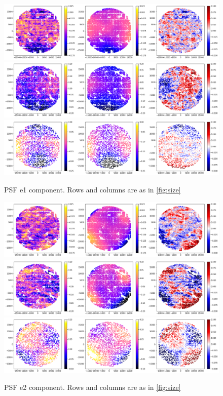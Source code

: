 \documentclass{article}
\begin{document}
\begin{figure}
    \includegraphics[width=\textwidth]{e1_69008.png}
    \includegraphics[width=\textwidth]{e1_69014.png}
    \includegraphics[width=\textwidth]{e1_69026.png}

    \caption{PSF e1 component.  Rows and columns are as in \ref{fig:size}}

    \label{fig:e1}
\end{figure}

\begin{figure}
    \includegraphics[width=\textwidth]{e2_69008.png}
    \includegraphics[width=\textwidth]{e2_69014.png}
    \includegraphics[width=\textwidth]{e2_69026.png}

    \caption{PSF e2 component.  Rows and columns are as in \ref{fig:size}}

    \label{fig:e2}
\end{figure}
\end{document}
